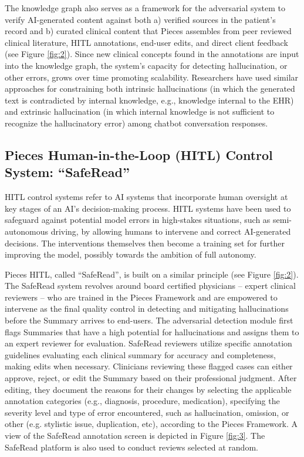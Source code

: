 \documentclass{style/myclass}
\begin{document}
The knowledge graph also serves as a framework for the adversarial system to verify AI-generated content against both a) verified sources in the patient’s record and b) curated clinical content that Pieces assembles from peer reviewed clinical literature, HITL annotations, end-user edits, and direct client feedback (see Figure \ref{fig:2}). Since new clinical concepts found in the annotations are input into the knowledge graph, the system’s capacity for detecting hallucination, or other errors, grows over time promoting scalability. Researchers have used similar approaches for constraining both intrinsic hallucinations (in which the generated text is contradicted by internal knowledge, e.g., knowledge internal to the EHR) and extrinsic hallucination (in which internal knowledge is not sufficient to recognize the hallucinatory error) among chatbot conversation responses.\cite{11}

\subsection{Pieces Human-in-the-Loop (HITL) Control System: “SafeRead”}

HITL control systems refer to AI systems that incorporate human oversight at key stages of an AI’s decision-making process. HITL systems have been used to safeguard against potential model errors in high-stakes situations, such as semi-autonomous driving, by allowing humans to intervene and correct AI-generated decisions. The interventions themselves then become a training set for further improving the model, possibly towards the ambition of full autonomy.

Pieces HITL, called “SafeRead”, is built on a similar principle (see Figure \ref{fig:2}). The SafeRead system revolves around board certified physicians – expert clinical reviewers – who are trained in the Pieces Framework and are empowered to intervene as the final quality control in detecting and mitigating hallucinations before the Summary arrives to end-users. The adversarial detection module first flags Summaries that have a high potential for hallucinations and assigns them to an expert reviewer for evaluation. SafeRead reviewers utilize specific annotation guidelines evaluating each clinical summary for accuracy and completeness, making edits when necessary. Clinicians reviewing these flagged cases can either approve, reject, or edit the Summary based on their professional judgment. After editing, they document the reasons for their changes by selecting the applicable annotation categories (e.g., diagnosis, procedure, medication), specifying the severity level and type of error encountered, such as hallucination, omission, or other (e.g. stylistic issue, duplication, etc), according to the Pieces Framework. A view of the SafeRead annotation screen is depicted in Figure \ref{fig:3}. The SafeRead platform is also used to conduct reviews selected at random.
\end{document}
